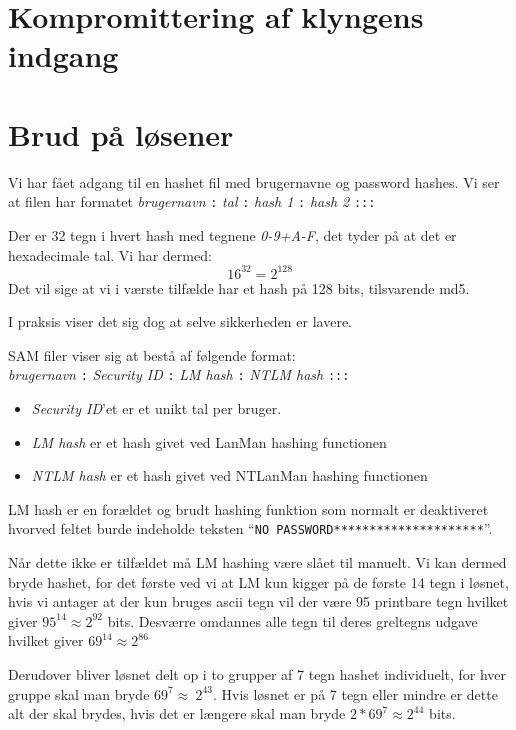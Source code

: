 \documentclass[10pt,a4paper,danish]{article}
\begin{document}
\section{Kompromittering af klyngens indgang}

\section{Brud på løsener}

Vi har fået adgang til en hashet fil med brugernavne og password hashes.
Vi ser at filen har formatet \textit{brugernavn} \texttt{:} \textit{tal}
\texttt{:} \textit{hash 1} \texttt{:} \textit{hash 2} \texttt{:::}

Der er 32 tegn i hvert hash med tegnene \textit{0-9+A-F}, det tyder på at det er
hexadecimale tal. Vi har dermed:
\[16^{32} = 2^{128}\]
Det vil sige at vi i værste tilfælde har et hash på 128 bits, tilsvarende md5.

I praksis viser det sig dog at selve sikkerheden er lavere.

SAM filer viser sig at bestå af følgende format\cite{cracking}:\\
\textit{brugernavn} \texttt{:} \textit{Security ID}
\texttt{:} \textit{LM hash} \texttt{:} \textit{NTLM hash} \texttt{:::}
\begin{itemize}
\item \textit{Security ID}'et er et unikt tal per bruger.
\item \textit{LM hash} er et hash givet ved LanMan hashing functionen
\item \textit{NTLM hash} er et hash givet ved NTLanMan hashing functionen
\end{itemize}

LM hash er en forældet og brudt hashing funktion som normalt er deaktiveret
hvorved feltet burde indeholde teksten ``\texttt{NO
  PASSWORD*********************}''.

Når dette ikke er tilfældet må LM hashing være slået til manuelt.
Vi kan dermed bryde hashet, for det første ved vi at LM kun kigger på de første
14 tegn i løsnet, hvis vi antager at der kun bruges ascii tegn vil der være 95
printbare tegn hvilket giver \(95^{14} \approx 2^{92}\) bits.
Desværre omdannes alle tegn til deres greltegns udgave hvilket giver \(69^{14}
\approx 2^{86}\)

Derudover bliver løsnet delt op i to grupper af 7 tegn hashet individuelt,
for hver gruppe skal man bryde \(69^{7} \approx \ 2^{43}\).
Hvis løsnet er på 7 tegn eller mindre er dette alt der skal brydes, hvis det er
længere skal man bryde \(2 * 69^{7} \approx 2^{44}\) bits.
\end{document}
